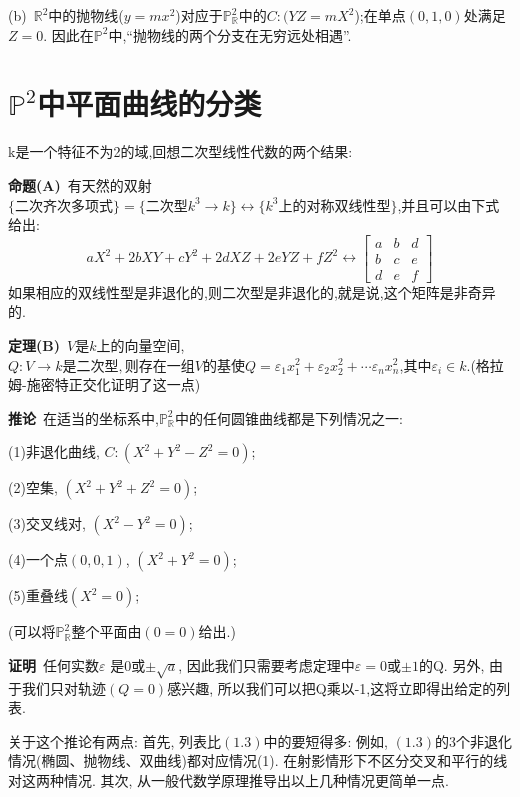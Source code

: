 \documentclass[UTF8]{book}
\begin{document}
		
		(b)\ $\mathbb{R}^{2}$中的抛物线($y=mx^{2}$)对应于$\mathbb{P}^{2}_{\mathbb{R}}$中的$C:(YZ=mX^{2}$);在单点$ (0,1,0) $处满足$ Z=0 $. 因此在$\mathbb{P}^{2}$中,“抛物线的两个分支在无穷远处相遇”.
	
	
	\section{$\mathbb{P}^{2}$中平面曲线的分类}
		k是一个特征不为2的域,回想二次型线性代数的两个结果:
		
		
		\textbf{命题(A)}\ 有天然的双射$\{ \text{二次齐次多项式} \}=\{\text{二次型}k^{3} \to k \} \longleftrightarrow \{k^{3}\text{上的对称双线性型}\}$,并且可以由下式给出:
		\begin{equation*}
		aX^{2}+2bXY+cY^{2}+2dXZ+2eYZ+fZ^{2} \longleftrightarrow \begin{bmatrix} a & b &d \\ b & c &e\\ d & e & f\end{bmatrix}
		\end{equation*}
		如果相应的双线性型是非退化的,则二次型是非退化的,就是说,这个矩阵是非奇异的.
		
		
		\textbf{定理(B)}\ $ V $是$ k $上的向量空间,$Q:V\to k\text{是二次型},\text{则存在一组}V\text{的基使}Q=\varepsilon_{1}x^{2}_{1}+\varepsilon_{2}x^{2}_{2}+\cdots\varepsilon_{n}x^{2}_{n}$,其中$\varepsilon_{i}\in k$.(格拉姆-施密特正交化证明了这一点)
		
		
		\textbf{推论}\ 在适当的坐标系中,$\mathbb{P}^{2}_{\mathbb{R}}$中的任何圆锥曲线都是下列情况之一:
		
			
		(1)非退化曲线, $C:(X^{2}+Y^{2}-Z^{2}=0)$;
		
		
		(2)空集, $(X^{2}+Y^{2}+Z^{2}=0)$;
		
		
		(3)交叉线对, $(X^{2}-Y^{2}=0)$;
		
		
		(4)一个点$(0,0,1)$, $(X^{2}+Y^{2}=0)$;
		
		
		(5)重叠线$(X^{2}=0)$;
		
		
		(可以将$\mathbb{P}^{2}_{\mathbb{R}}$整个平面由$ (0=0) $给出.)
		
	
		\textbf{证明}\ 任何实数$\varepsilon$ 是0或$\pm \sqrt{a}$, 因此我们只需要考虑定理中$\varepsilon=0$或$\pm1$的Q. 另外, 由于我们只对轨迹$ (Q = 0) $感兴趣, 所以我们可以把Q乘以-1,这将立即得出给定的列表.
		
		
		关于这个推论有两点: 首先, 列表比$ (1.3) $中的要短得多: 例如, $ (1.3) $的3个非退化情况(椭圆、抛物线、双曲线)都对应情况(1). 在射影情形下不区分交叉和平行的线对这两种情况. 其次, 从一般代数学原理推导出以上几种情况更简单一点.
\end{document}
